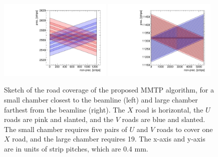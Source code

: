 \begin{figure}[!htpb]
  \begin{center}
    \includegraphics[width=0.48\textwidth]{figures/cartoon_roads_small_smallstereo_N.pdf}
    \includegraphics[width=0.48\textwidth]{figures/cartoon_roads_large_smallstereo_N.pdf}
  \end{center}
  \vspace{-10pt}
  \caption{Sketch of the road coverage of the proposed MMTP algorithm, for a small chamber closest to the beamline (left) and large chamber farthest from the beamline (right). The $X$ road is horizontal, the $U$ roads are pink and slanted, and the $V$ roads are blue and slanted. The small chamber requires five pairs of $U$ and $V$ roads to cover one $X$ road, and the large chamber requires 19. The x-axis and y-axis are in units of strip pitches, which are 0.4 mm.}
  \label{fig:cartoon_smallroads_N}
\end{figure}

